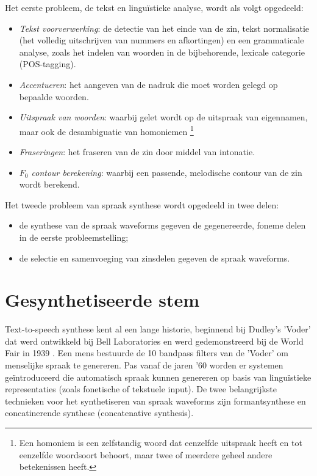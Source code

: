 Het eerste probleem, de tekst en linguïstieke analyse, wordt als volgt opgedeeld:
\begin{itemize}
    \item \textit{Tekst voorverwerking}: de detectie van het einde van de zin, tekst normalisatie (het volledig uitschrijven van nummers en afkortingen) en een grammaticale analyse, zoals het indelen van woorden in de bijbehorende, lexicale categorie (POS-tagging).
    \item \textit{Accentueren}: het aangeven van de nadruk die moet worden gelegd op bepaalde woorden.
    \item \textit{Uitspraak van woorden}: waarbij gelet wordt op de uitspraak van eigennamen, maar ook de desambiguatie van homoniemen \footnote{Een homoniem is een zelfstandig woord dat eenzelfde uitspraak heeft en tot eenzelfde woordsoort behoort, maar twee of meerdere geheel andere betekenissen heeft.}
    \item \textit{Fraseringen}: het fraseren van de zin door middel van intonatie.
    \item \textit{$F_0$ contour berekening}: waarbij een passende, melodische contour van de zin wordt berekend.
\end{itemize}

Het tweede probleem van spraak synthese wordt opgedeeld in twee delen:
\begin{itemize}
    \item de synthese van de spraak waveforms gegeven de gegenereerde, foneme delen in de eerste probleemstelling;
    \item de selectie en samenvoeging van zinsdelen gegeven de spraak waveforms.
\end{itemize}

\section{Gesynthetiseerde stem}

Text-to-speech synthese kent al een lange historie, beginnend bij Dudley's 'Voder' dat werd ontwikkeld bij Bell Laboratories en werd gedemonstreerd bij de World Fair in 1939 \cite{voder}. Een mens bestuurde de 10 bandpass filters van de 'Voder' om menselijke spraak te genereren. Pas vanaf de jaren '60 worden er systemen geïntroduceerd die automatisch spraak kunnen genereren op basis van linguïstieke representaties (zoals fonetische of tekstuele input). De twee belangrijkste technieken voor het synthetiseren van spraak waveforms zijn formantsynthese en concatinerende synthese (concatenative synthesis).

